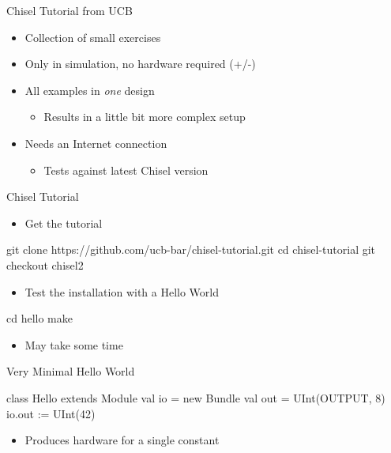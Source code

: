 \documentclass[xcolor=pdflatex,dvipsnames,table]{beamer}
\begin{document}
\begin{frame}[fragile]{Chisel Tutorial from UCB}
\begin{itemize}
\item Collection of small exercises
\item Only in simulation, no hardware required (+/-)
\item All examples in \emph{one} design
\begin{itemize}
\item Results in a little bit more complex setup
\end{itemize}
\item Needs an Internet connection
\begin{itemize}
\item  Tests against latest Chisel version
\end{itemize}
\end{itemize}
\end{frame}

\begin{frame}[fragile]{Chisel Tutorial}
\begin{itemize}
\item Get the tutorial
\end{itemize}
\begin{chisel}
git clone https://github.com/ucb-bar/chisel-tutorial.git
cd chisel-tutorial
git checkout chisel2
\end{chisel}
\begin{itemize}
\item Test the installation with a Hello World
\end{itemize}
\begin{chisel}
cd hello
make
\end{chisel}
\begin{itemize}
\item May take some time
\end{itemize}
\end{frame}

\begin{frame}[fragile]{Very Minimal Hello World}
\begin{chisel}
class Hello extends Module {
  val io = new Bundle { 
    val out = UInt(OUTPUT, 8)
  }
  io.out := UInt(42)
}
\end{chisel}
\begin{itemize}
\item Produces hardware for a single constant
\end{itemize}
\end{frame}
\end{document}
